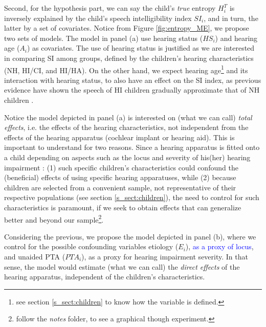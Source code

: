 Second, for the hypothesis part, we can say the child's \textit{true} entropy $H^{T}_{i}$ is inversely explained by the child's speech intelligibility index $SI_{i}$, and in turn, the latter by a set of covariates. Notice from Figure \ref{fig:entropy_ME}, we propose two sets of models. The model in panel (a) use hearing status ($HS_{i}$) and hearing age ($A_{i}$) as covariates. The use of hearing status is justified as we are interested in comparing SI among groups, defined by the children's hearing characteristics (NH, HI/CI, and HI/HA). On the other hand, we expect hearing age\footnote{see section \ref{s_sect:children} to know how the variable is defined.} and its interaction with hearing status, to also have an effect on the SI index, as previous evidence have shown the speech of HI children gradually approximate that of NH children \citep{Boonen_et_al_2019}.

Notice the model depicted in panel (a) is interested on (what we can call) \textit{total effects}, i.e. the effects of the hearing characteristics, not independent from the effects of the hearing apparatus (cochlear implant or hearing aid). This is important to understand for two reasons. Since a hearing apparatus is fitted onto a child depending on aspects such as the locus and severity of his(her) hearing impairment \citep{Korver_et_al_2017}: (1) such specific children's characteristics could confound the (beneficial) effects of using specific hearing apparatuses, while (2) because children are selected from a convenient sample, not representative of their respective populations (see section \ref{s_sect:children}), the need to control for such characteristics is paramount, if we seek to obtain effects that can generalize better and beyond our sample\footnote{follow the \textit{notes} folder, to see a graphical though experiment.}.

Considering the previous, we propose the model depicted in panel (b), where we control for the possible confounding variables etiology ($E_{i}$), \textcolor{blue}{as a proxy of locus}, and unaided PTA ($PTA_{i}$), as a proxy for hearing impairment severity. In that sense, the model would estimate (what we can call) the \textit{direct effects} of the hearing apparatus, independent of the children's characteristics.

